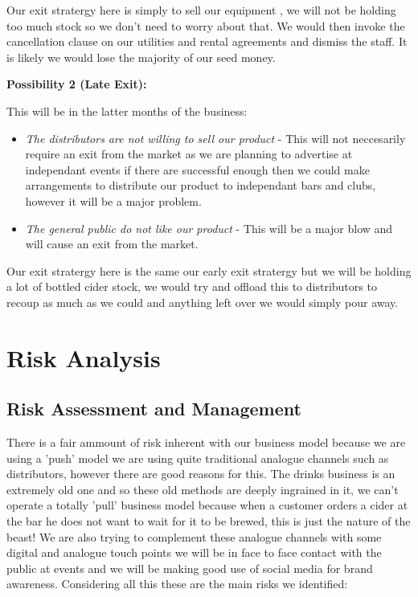 \documentclass[11pt]{article}
\begin{document}
Our exit stratergy here is simply to sell our equipment , we will not be holding
too much stock so we don't need to worry about that. We would then invoke the
cancellation clause on our utilities and rental agreements and dismiss the
staff. It is likely we would lose the majority of our seed money.

\textbf{Possibility 2 (Late Exit):}

This will be in the latter months of the business:
  \begin{itemize}
	\item \emph{The distributors are not willing to sell our product} - This will
not neccesarily require an exit from the market as we are planning to advertise
at independant events if there are successful enough then we could make
arrangements to distribute our product to independant bars and clubs, however it
will be a major problem.
	\item \emph{The general public do not like our product} - This will be a major
blow and will cause an exit from the market.
  \end{itemize}

Our exit stratergy here is the same our early exit stratergy but we will be 
holding a lot of bottled cider stock, we would try and offload this to
distributors to recoup as much as we could and anything left over we would 
simply pour away.

\newpage


\section{Risk Analysis}

  \subsection{Risk Assessment and Management}
There is a fair ammount of risk inherent with our business model because we are 
using a 'push' model we are using quite traditional analogue channels such as 
distributors, however there are good reasons for this. The drinks business is an
extremely old one and so these old methods are deeply ingrained in it, we can't 
operate a totally 'pull' business model because when a customer orders a cider 
at the bar he does not want to wait for it to be brewed, this is just the nature
of the beast! We are also trying to complement these analogue channels with some
digital and analogue touch points we will be in face to face contact with the 
public at events and we will be making good use of social media for brand 
awareness. Considering all this these are the main risks we identified:
\end{document}

